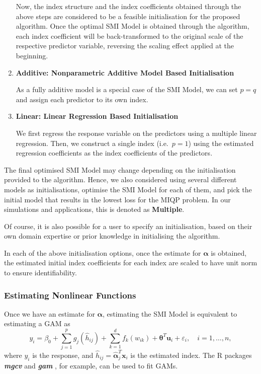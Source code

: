 \documentclass[
  11pt,
  a4paper,
]{article}
\begin{document}
\begin{enumerate}
  Now, the index structure and the index coefficients obtained through
  the above steps are considered to be a feasible initialisation for the
  proposed algorithm. Once the optimal SMI Model is obtained through the
  algorithm, each index coefficient will be back-transformed to the
  original scale of the respective predictor variable, reversing the
  scaling effect applied at the beginning.
\item
  \textbf{Additive: Nonparametric Additive Model Based Initialisation}

  As a fully additive model is a special case of the SMI Model, we can
  set \(p=q\) and assign each predictor to its own index.
\item
  \textbf{Linear: Linear Regression Based Initialisation}

  We first regress the response variable on the predictors using a
  multiple linear regression. Then, we construct a single index
  (i.e.~\(p = 1\)) using the estimated regression coefficients as the
  index coefficients of the predictors.
\end{enumerate}

The final optimised SMI Model may change depending on the initialisation
provided to the algorithm. Hence, we also considered using several
different models as initialisations, optimise the SMI Model for each of
them, and pick the initial model that results in the lowest loss for the
MIQP problem. In our simulations and applications, this is denoted as
\textbf{Multiple}.

Of course, it is also possible for a user to specify an initialisation,
based on their own domain expertise or prior knowledge in initialising
the algorithm.

In each of the above initialisation options, once the estimate for
\(\bm{\alpha}\) is obtained, the estimated initial index coefficients
for each index are scaled to have unit norm to ensure identifiability.

\subsubsection{Estimating Nonlinear Functions}\label{sec-step2}

Once we have an estimate for \(\bm{\alpha}\), estimating the SMI Model
is equivalent to estimating a GAM as \[
  y_{i} = \beta_{0} + \sum_{j = 1}^{p}g_{j}(\hat{h}_{ij}) + \sum_{k = 1}^{d}f_{k}(w_{ik}) + \bm{\theta}^{T}\bm{u}_{i} + \varepsilon_{i}, \quad i = 1, \dots, n,
\] where \(y_{i}\) is the response, and
\(\hat{h}_{ij} = \hat{\bm{\alpha}}_{j}^{T}\bm{x}_{i}\) is the estimated
index. The R packages \textbf{\emph{mgcv}} \autocite{Wood2011} and
\textbf{\emph{gam}} \autocite{Hastie2023}, for example, can be used to
fit GAMs.
\end{document}
